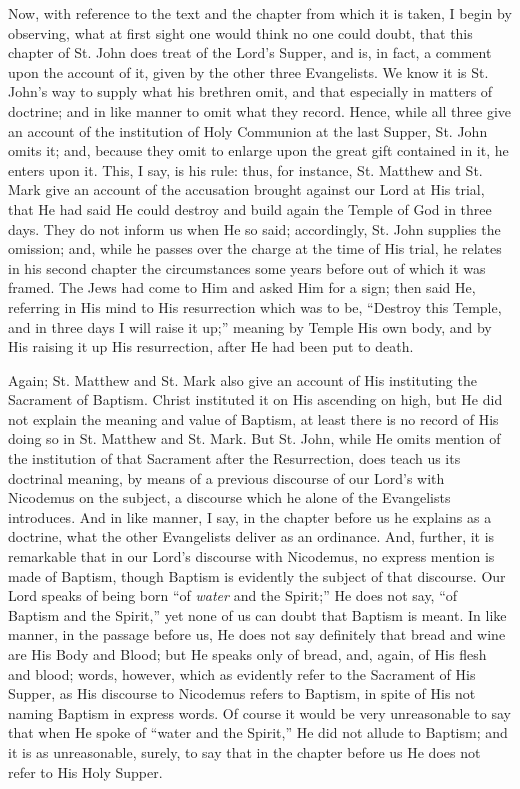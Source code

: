 Now, with reference to the text and the chapter from which it is
taken, I begin by observing, what at first sight one would think no
one could doubt, that this chapter of St. John does treat of the
Lord's Supper, and is, in fact, a comment upon the account of it,
given by the other three Evangelists. We know it is St. John's way to
supply what his brethren omit, and that especially in matters of
doctrine; and in like manner to omit what they record. Hence, while
all three give an account of the institution of Holy Communion at the
last Supper, St. John omits it; and, because they omit to enlarge upon
the great gift contained in it, he enters upon it. This, I say, is his
rule: thus, for instance, St. Matthew and St. Mark give an account of
the accusation brought against our Lord at His trial, that He had said
He could destroy and build again the Temple of God in three days. They
do not inform us when He so said; accordingly, St. John supplies the
omission; and, while he passes over the charge at the time of His
trial, he relates in his second chapter the circumstances some years
before out of which it was framed. The Jews had come to Him and asked
Him for a sign; then said He, referring in His mind to His
resurrection which was to be, ``Destroy this Temple, and in three
days I will raise it up;'' meaning by Temple His own body, and by
His raising it up His resurrection, after He had been put to death.

Again; St. Matthew and St. Mark also give an account of His
instituting the Sacrament of Baptism. Christ instituted it on His
ascending on high, but He did not explain the meaning and value of
Baptism, at least there is no record of His doing so in St. Matthew
and St. Mark. But St. John, while He omits mention of the institution
of that Sacrament after the Resurrection, does teach us its doctrinal
meaning, by means of a previous discourse of our Lord's with Nicodemus
on the subject, a discourse which he alone of the Evangelists
introduces. And in like manner, I say, in the chapter before us he
explains as a doctrine, what the other Evangelists deliver as an
ordinance. And, further, it is remarkable that in our Lord's discourse
with Nicodemus, no express mention is made of Baptism, though Baptism
is evidently the subject of that discourse. Our Lord speaks of being
born ``of \emph{water} and the Spirit;'' He does not say,
``of Baptism and the Spirit,'' yet none of us can doubt that
Baptism is meant. In like manner, in the passage before us, He does
not say definitely that bread and wine are His Body and Blood; but He
speaks only of bread, and, again, of His flesh and blood; words,
however, which as evidently refer to the Sacrament of His Supper, as
His discourse to Nicodemus refers to Baptism, in spite of His not
naming Baptism in express words. Of course it would be very
unreasonable to say that when He spoke of ``water and the
Spirit,'' He did not allude to Baptism; and it is as unreasonable,
surely, to say that in the chapter before us He does not refer to His
Holy Supper.

